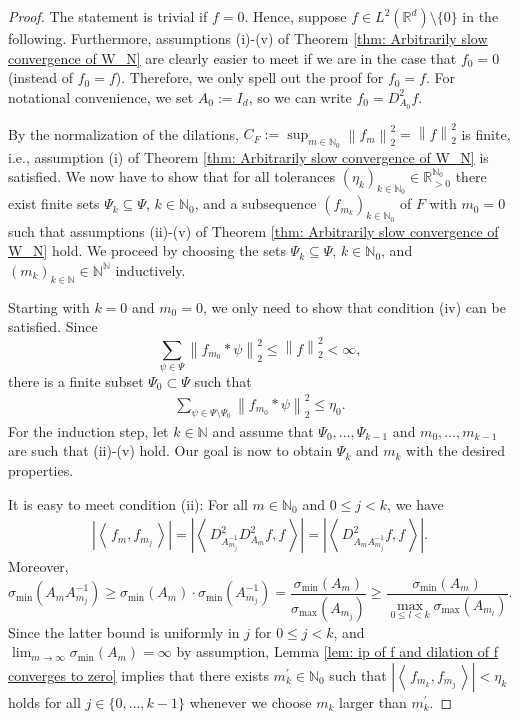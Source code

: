\documentclass[11pt]{amsart}
\newcommand{\R}{{\mathbb{R}}}
\newcommand{\N}{\mathbb{N}}
\newcommand{\norm}[1]{\ensuremath{\left\lVert\text{}#1\text{}\right\rVert}}
\newcommand{\ip}[1]{\ensuremath{\left<\text{} \, #1 \, \text{}\right>}}
\newenvironment{proof sketch} {\textit{Proof sketch.}}{}
\begin{document}
  \begin{proof}
    The statement is trivial if $f=0$. Hence, suppose $f \in L^2(\R^d)\setminus\{0\}$ in the following. Furthermore, assumptions (i)-(v) of Theorem \ref{thm: Arbitrarily slow convergence of W_N} are clearly easier to meet if we are in the case that $f_0=0$ (instead of $f_0=f$). Therefore, we only spell out the proof for $f_0=f$. For notational convenience, we set $A_0:=I_d$, so we can write $f_0=D_{A_0}^2f$.
  
    By the normalization of the dilations, $C_F:=\sup_{m\in \N_0}\norm{f_m}_2^2=\norm{f}_2^2$ is finite, i.e., assumption (i) of Theorem \ref{thm: Arbitrarily slow convergence of W_N} is satisfied. We now have to show that for all tolerances $(\eta_k)_{k \in \N_0} \in \R_{>0}^{\N_0}$ there exist finite sets $\Psi_k\subseteq \Psi$, $k \in \N_0$, and a subsequence $(f_{m_k})_{k \in \N_0}$ of $F$ with $m_0=0$ such that assumptions (ii)-(v) of Theorem \ref{thm: Arbitrarily slow convergence of W_N} hold.
    We proceed by choosing the sets $\Psi_k\subseteq \Psi$, $k \in \N_0$, and $({m_k})_{k \in \N}\in \N^\N$ inductively.
    
    Starting with $k=0$ and $m_0=0$, we only need to show that condition (iv) can be satisfied. Since 
    \[\sum_{\psi \in \Psi} \norm{f_{m_0}*\psi}_2^2\leq \norm{f}_2^2<\infty,\] there is a finite subset $\Psi_0\subset \Psi$ such that 
    \begin{align*}
      \sum_{\psi \in \Psi\setminus\Psi_0} \norm{f_{m_0}*\psi}_2^2 \leq \eta_0.
    \end{align*} 
    For the induction step, let $k \in \N$ and assume that $\Psi_0,\ldots,\Psi_{k-1}$ and $m_0,\ldots,m_{k-1}$ are such that (ii)-(v) hold. Our goal is now to obtain $\Psi_k$ and $m_k$ with the desired properties. 
    
    It is easy to meet condition (ii): For all $m \in \N_0$ and $0\leq j <k$, we have
    \begin{align*}
      \left|\ip{f_m,f_{m_j}}\right|=\left|\ip{D_{A_{m_j}^{-1}}^2D_{A_{m}}^2f,f}\right|
      =\left|\ip{D_{A_{m}A_{m_j}^{-1}}^2f,f}\right|.
    \end{align*}
    Moreover,
    \[\sigma_{\text{min}}\left(A_{m}A_{m_j}^{-1}\right)
    \geq \sigma_{\text{min}}\left(A_m\right) \cdot \sigma_{\text{min}}\left(A_{m_j}^{-1}\right)
    =\frac{\sigma_{\text{min}}\left(A_{m}\right)}{\sigma_{\text{max}}\left(A_{m_j}\right)}
    \geq \frac{\sigma_{\text{min}}\left(A_{m}\right)}{\max_{0\leq l<k}\sigma_{\text{max}}\left(A_{m_l}\right)}.\]
    Since the latter bound is uniformly in $j$ for $0\leq j<k$, and $\lim_{m \to \infty}\sigma_{\text{min}}\left(A_{m}\right)=\infty$ by assumption, Lemma \ref{lem: ip of f and dilation of f converges to zero} implies that there exists $m_k^\prime \in \N_0$ such that $\left|\ip{f_{m_k},f_{m_j}}\right|<\eta_k$ holds for all $j \in \{0,\ldots,k-1\}$ whenever we choose $m_k$ larger than $m_k^\prime$. 
  

\end{proof}
\end{document}
